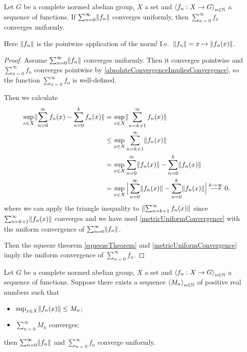 \begin{lemma}
Let $G$ be a complete normed abelian group, $X$ a set and $\left\langle f_n: X\to G \right\rangle_{n\in\mathbb{N}}$ a sequence of functions. If $\sum_{n=0}^\infty \lVert f_n\rVert$ converges uniformly, then $\sum_{n=0}^\infty f_n$ converges uniformly.
\end{lemma}
Here $\lVert f_n\rVert$ is the pointwise application of the norm! I.e.\ $\lVert f_n\rVert = x\mapsto \lVert f_n(x)\rVert$.
\begin{proof}
Assume $\sum_{n=0}^\infty \lVert f_n\rVert$ converges uniformly. Then it converges pointwise and $\sum_{n=0}^\infty f_n$ converges pointwise by \ref{absoluteConvergenceImpliesConvergence}, so the function $\sum_{n=0}^\infty f_n$ is well-defined.

Then we calculate
\begin{align*}
\sup_{x\in X}\lVert\sum_{n=0}^\infty f_n(x) - \sum_{n=0}^k f_n(x)\rVert &= \sup_{x\in X}\lVert\sum_{n=k+1}^\infty f_n(x)\rVert \\
&\leq \sup_{x\in X}\sum_{n=k+1}^\infty \lVert f_n(x)\rVert \\
&= \sup_{x\in X}\sum_{n=0}^\infty \lVert f_n(x)\rVert - \sum_{n=0}^k \lVert f_n(x)\rVert \\
&= \sup_{x\in X}\Big|\sum_{n=0}^\infty \lVert f_n(x)\rVert - \sum_{n=0}^k \lVert f_n(x)\rVert\Big| \overset{k\to \infty}{\longrightarrow} 0.
\end{align*}
where we can apply the triangle inequality to $\lVert\sum_{n=k+1}^\infty f_n(x)\rVert$ since $\sum_{n=k+1}^\infty \lVert f_n(x)\rVert$ converges and we have used \ref{metricUniformConvergence} with the uniform convergence of $\sum_{n=0}^\infty \lVert f_n\rVert$.

Then the squeeze theorem \ref{squeezeTheorem} and \ref{metricUniformConvergence} imply the uniform convergence of $\sum_{n=0}^\infty f_n$.
\end{proof}
\begin{corollary} \label{WeierstrassMTest}
Let $G$ be a complete normed abelian group, $X$ a set and $\left\langle f_n: X\to G \right\rangle_{n\in\mathbb{N}}$ a sequence of functions. Suppose there exists a sequence $\left\langle M_n \right\rangle_{n\in\mathbb{N}}$ of positive real numbers such that
\begin{itemize}
\item $\sup_{x\in X}\lVert f_n(x)\rVert \leq M_n$;
\item $\sum_{n=0}^\infty M_n$ converges;
\end{itemize}
then $\sum_{n=0}^\infty \lVert f_n\rVert$ and $\sum_{n=0}^\infty f_n$ converge uniformly.
\end{corollary}
